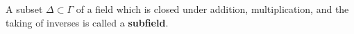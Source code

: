 A subset $\Delta \subset \Gamma$ of a field which is closed under addition, multiplication, and the taking of inverses is called a \textbf{subfield}.
